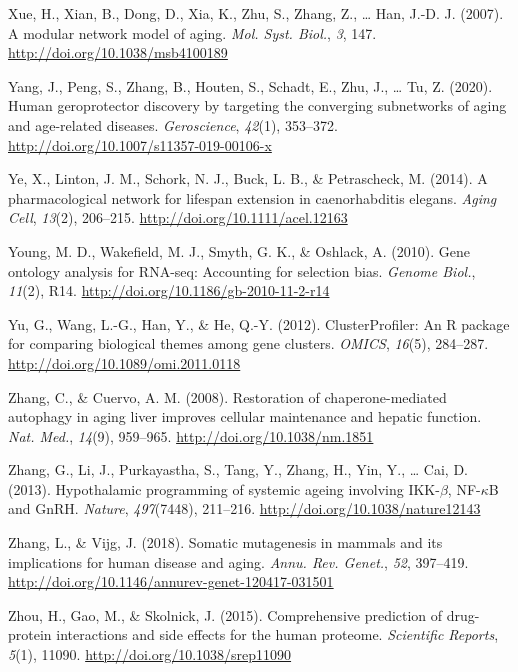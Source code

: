 \documentclass[12pt,twoside]{unicam}
\begin{document}
\begin{cslreferences}
\leavevmode\hypertarget{ref-Xue2007}{}%
Xue, H., Xian, B., Dong, D., Xia, K., Zhu, S., Zhang, Z., \ldots{} Han, J.-D. J. (2007). A modular network model of aging. \emph{Mol. Syst. Biol.}, \emph{3}, 147. \url{http://doi.org/10.1038/msb4100189}

\leavevmode\hypertarget{ref-Yang2018}{}%
Yang, J., Peng, S., Zhang, B., Houten, S., Schadt, E., Zhu, J., \ldots{} Tu, Z. (2020). Human geroprotector discovery by targeting the converging subnetworks of aging and age-related diseases. \emph{Geroscience}, \emph{42}(1), 353--372. \url{http://doi.org/10.1007/s11357-019-00106-x}

\leavevmode\hypertarget{ref-Ye2014}{}%
Ye, X., Linton, J. M., Schork, N. J., Buck, L. B., \& Petrascheck, M. (2014). A pharmacological network for lifespan extension in caenorhabditis elegans. \emph{Aging Cell}, \emph{13}(2), 206--215. \url{http://doi.org/10.1111/acel.12163}

\leavevmode\hypertarget{ref-Young2010}{}%
Young, M. D., Wakefield, M. J., Smyth, G. K., \& Oshlack, A. (2010). Gene ontology analysis for RNA-seq: Accounting for selection bias. \emph{Genome Biol.}, \emph{11}(2), R14. \url{http://doi.org/10.1186/gb-2010-11-2-r14}

\leavevmode\hypertarget{ref-Yu2012}{}%
Yu, G., Wang, L.-G., Han, Y., \& He, Q.-Y. (2012). ClusterProfiler: An R package for comparing biological themes among gene clusters. \emph{OMICS}, \emph{16}(5), 284--287. \url{http://doi.org/10.1089/omi.2011.0118}

\leavevmode\hypertarget{ref-Zhang2008}{}%
Zhang, C., \& Cuervo, A. M. (2008). Restoration of chaperone-mediated autophagy in aging liver improves cellular maintenance and hepatic function. \emph{Nat. Med.}, \emph{14}(9), 959--965. \url{http://doi.org/10.1038/nm.1851}

\leavevmode\hypertarget{ref-Zhang2013}{}%
Zhang, G., Li, J., Purkayastha, S., Tang, Y., Zhang, H., Yin, Y., \ldots{} Cai, D. (2013). Hypothalamic programming of systemic ageing involving IKK-\(\beta\), NF-\(\kappa\)B and GnRH. \emph{Nature}, \emph{497}(7448), 211--216. \url{http://doi.org/10.1038/nature12143}

\leavevmode\hypertarget{ref-Zhang2018}{}%
Zhang, L., \& Vijg, J. (2018). Somatic mutagenesis in mammals and its implications for human disease and aging. \emph{Annu. Rev. Genet.}, \emph{52}, 397--419. \url{http://doi.org/10.1146/annurev-genet-120417-031501}

\leavevmode\hypertarget{ref-Zhou2015}{}%
Zhou, H., Gao, M., \& Skolnick, J. (2015). Comprehensive prediction of drug-protein interactions and side effects for the human proteome. \emph{Scientific Reports}, \emph{5}(1), 11090. \url{http://doi.org/10.1038/srep11090}


\end{cslreferences}
\end{document}
